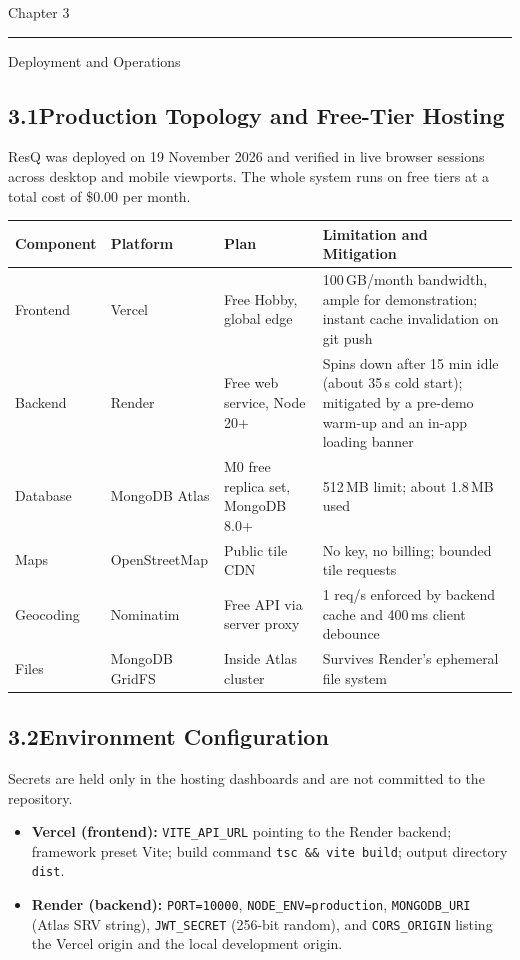 \documentclass[11pt,a4paper]{article}
\newcommand{\chaptertitle}[2]{%
  \vspace*{0pt}%
  {\normalfont\fontsize{22}{25}\selectfont #1\par}%
  \vspace{2pt}%
  \noindent\rule{\textwidth}{0.7pt}\par
  \vspace{7pt}%
  {\normalfont\fontsize{22}{25}\selectfont #2\par}
  \vspace{5pt}%
}
\newcommand{\tc}[1]{\texttt{\small #1}}
\begin{document}
\newpage

\label{ch3}
\chaptertitle{Chapter 3}{Deployment and Operations}

\subsection{3.1\quad Production Topology and Free-Tier Hosting}\label{s31}

ResQ was deployed on 19 November 2026 and verified in live browser sessions across desktop and mobile viewports. The whole system runs on free tiers at a total cost of \$0.00 per month.

\renewcommand{\arraystretch}{1.2}
\begin{tabularx}{\textwidth}{@{}p{0.95in}p{1.0in}p{1.55in}X@{}}
\toprule
\textbf{Component} & \textbf{Platform} & \textbf{Plan} & \textbf{Limitation and Mitigation}\\
\midrule
Frontend & Vercel & Free Hobby, global edge & 100\,GB/month bandwidth, ample for demonstration; instant cache invalidation on git push\\
Backend & Render & Free web service, Node 20+ & Spins down after 15 min idle (about 35\,s cold start); mitigated by a pre-demo warm-up and an in-app loading banner\\
Database & MongoDB Atlas & M0 free replica set, MongoDB 8.0+ & 512\,MB limit; about 1.8\,MB used\\
Maps & OpenStreetMap & Public tile CDN & No key, no billing; bounded tile requests\\
Geocoding & Nominatim & Free API via server proxy & 1 req/s enforced by backend cache and 400\,ms client debounce\\
Files & MongoDB GridFS & Inside Atlas cluster & Survives Render's ephemeral file system\\
\bottomrule
\end{tabularx}
\renewcommand{\arraystretch}{1}

\subsection{3.2\quad Environment Configuration}\label{s32}

Secrets are held only in the hosting dashboards and are not committed to the repository.

\begin{itemize}
\item \textbf{Vercel (frontend):} \tc{VITE\_API\_URL} pointing to the Render backend; framework preset Vite; build command \tc{tsc \&\& vite build}; output directory \tc{dist}.
\item \textbf{Render (backend):} \tc{PORT=10000}, \tc{NODE\_ENV=production}, \tc{MONGODB\_URI} (Atlas SRV string), \tc{JWT\_SECRET} (256-bit random), and \tc{CORS\_ORIGIN} listing the Vercel origin and the local development origin.
\end{itemize}
\end{document}
